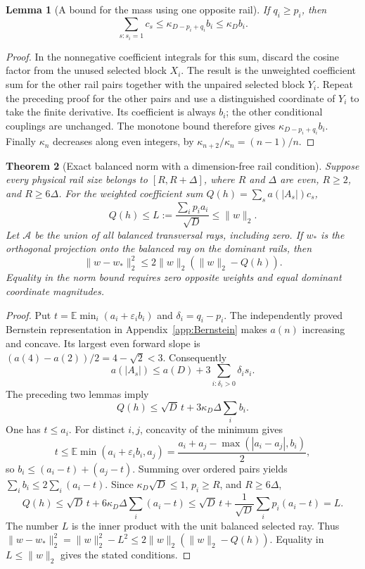 \documentclass[11pt]{article}
\newtheorem{theorem}{Theorem}
\newtheorem{lemma}[theorem]{Lemma}
\theoremstyle{remark}\newtheorem{remark}[theorem]{Remark}
\begin{document}
\begin{lemma}[A bound for the mass using one opposite rail]
\label{lem:opposite-mass}
If $q_i\ge p_i$, then
\[
 \sum_{s:s_i=1}c_s\le\kappa_{D-p_i+q_i}b_i\le\kappa_D b_i.
\]
\end{lemma}
\begin{proof}
In the nonnegative coefficient integrals for this sum, discard the
cosine factor from the unused selected block $X_i$. The result is the
unweighted coefficient sum for the other rail pairs together with the
unpaired selected block $Y_i$. Repeat the preceding proof for the other
pairs and use a distinguished coordinate of $Y_i$ to take the finite
derivative. Its coefficient is always $b_i$; the other conditional
couplings are unchanged. The monotone bound therefore gives
$\kappa_{D-p_i+q_i}b_i$. Finally $\kappa_n$ decreases along even
integers, by $\kappa_{n+2}/\kappa_n=(n-1)/n$.
\end{proof}

\begin{theorem}[Exact balanced norm with a dimension-free rail condition]
Suppose every physical rail size belongs to $[R,R+\Delta]$, where
$R$ and $\Delta$ are even, $R\ge2$, and $R\ge6\Delta$.
For the weighted coefficient sum
$Q(h)=\sum_s a(|A_s|)c_s$,
\[
 Q(h)\le L:=\frac{\sum_i p_i a_i}{\sqrt D}\le\|w\|_2.
\]
Let $\mathcal A$ be the union of all balanced transversal rays, including
zero. If $w_*$ is the orthogonal projection onto the balanced ray on the
dominant rails, then
\[
 \|w-w_*\|_2^2\le2\|w\|_2(\|w\|_2-Q(h)).
\]
Equality in the norm bound requires zero opposite weights and equal
dominant coordinate magnitudes.
\end{theorem}
\begin{proof}
Put $t=\mathbb E\min_i(a_i+\varepsilon_i b_i)$ and
$\delta_i=q_i-p_i$. The independently proved Bernstein representation in
Appendix~\ref{app:Bernstein} makes
$a(n)$ increasing and concave. Its largest even forward slope is
$(a(4)-a(2))/2=4-\sqrt2<3$. Consequently
\[
 a(|A_s|)\le a(D)+3\sum_{i:\delta_i>0}\delta_i s_i.
\]
The preceding two lemmas imply
\[
 Q(h)\le\sqrt D\,t+3\kappa_D\Delta\sum_i b_i.
\]
One has $t\le a_i$. For distinct $i,j$, concavity of the minimum gives
\[
 t\le\mathbb E\min(a_i+\varepsilon_i b_i,a_j)
 =\frac{a_i+a_j-\max(|a_i-a_j|,b_i)}2,
\]
so $b_i\le(a_i-t)+(a_j-t)$. Summing over ordered pairs yields
$\sum_i b_i\le2\sum_i(a_i-t)$. Since
$\kappa_D\sqrt D\le1$, $p_i\ge R$, and $R\ge6\Delta$,
\[
 Q(h)\le\sqrt D\,t+6\kappa_D\Delta\sum_i(a_i-t)
 \le\sqrt D\,t+\frac1{\sqrt D}\sum_i p_i(a_i-t)=L.
\]
The number $L$ is the inner product with the unit balanced selected ray.
Thus $\|w-w_*\|_2^2=\|w\|_2^2-L^2\le
2\|w\|_2(\|w\|_2-Q(h))$. Equality in $L\le\|w\|_2$ gives the
stated conditions.
\end{proof}
\end{document}
